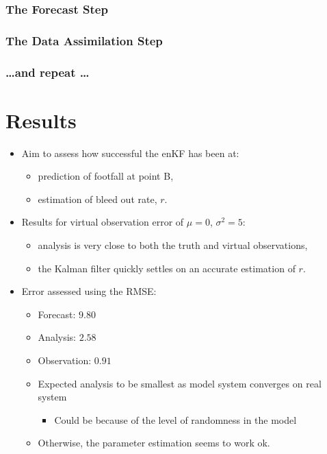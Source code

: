 \subsubsection{The Forecast Step}
\label{methods:application:forecast}

\subsubsection{The Data Assimilation Step}
\label{methods:applicaiton:assimilation}

\subsubsection{\ldots and repeat \ldots}
\label{methods:application:repeat}

\section{Results}
\label{malleson:results}

\begin{itemize}
    \item Aim to assess how successful the enKF has been at:
    \begin{itemize}
        \item prediction of footfall at point B,
        \item estimation of bleed out rate, $r$.
    \end{itemize}
    \item Results for virtual observation error of $\mu=0$, $\sigma^2 = 5$:
    \begin{itemize}
        \item analysis is very close to both the truth and virtual observations,
        \item the Kalman filter quickly settles on an accurate estimation of $r$.
    \end{itemize}
    \item Error assessed using the RMSE:
    \begin{itemize}
        \item Forecast: $9.80$
        \item Analysis: $2.58$
        \item Observation: $0.91$
    \item Expected analysis to be smallest as model system converges on real system
    \begin{itemize}
        \item Could be because of the level of randomness in the model
    \end{itemize}
    \item Otherwise, the parameter estimation seems to work ok.
    \end{itemize}
\end{itemize}

